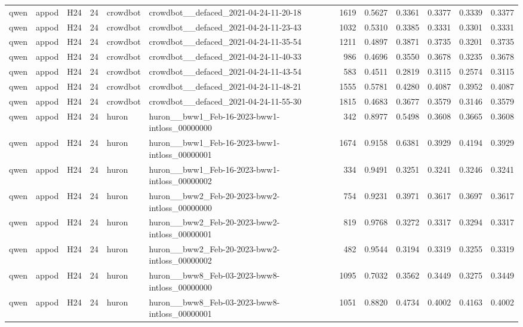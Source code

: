 \begin{table}[tbp]
\begin{tabular}{lllrllrrrrrr}
qwen & appod & H24 & 24 & crowdbot & crowdbot\_\_defaced\_2021-04-24-11-20-18 & 1619 & 0.5627 & 0.3361 & 0.3377 & 0.3339 & 0.3377 \\
qwen & appod & H24 & 24 & crowdbot & crowdbot\_\_defaced\_2021-04-24-11-23-43 & 1032 & 0.5310 & 0.3385 & 0.3331 & 0.3301 & 0.3331 \\
qwen & appod & H24 & 24 & crowdbot & crowdbot\_\_defaced\_2021-04-24-11-35-54 & 1211 & 0.4897 & 0.3871 & 0.3735 & 0.3201 & 0.3735 \\
qwen & appod & H24 & 24 & crowdbot & crowdbot\_\_defaced\_2021-04-24-11-40-33 & 986 & 0.4696 & 0.3550 & 0.3678 & 0.3235 & 0.3678 \\
qwen & appod & H24 & 24 & crowdbot & crowdbot\_\_defaced\_2021-04-24-11-43-54 & 583 & 0.4511 & 0.2819 & 0.3115 & 0.2574 & 0.3115 \\
qwen & appod & H24 & 24 & crowdbot & crowdbot\_\_defaced\_2021-04-24-11-48-21 & 1555 & 0.5781 & 0.4280 & 0.4087 & 0.3952 & 0.4087 \\
qwen & appod & H24 & 24 & crowdbot & crowdbot\_\_defaced\_2021-04-24-11-55-30 & 1815 & 0.4683 & 0.3677 & 0.3579 & 0.3146 & 0.3579 \\
qwen & appod & H24 & 24 & huron & huron\_\_bww1\_Feb-16-2023-bww1-intloss\_00000000 & 342 & 0.8977 & 0.5498 & 0.3608 & 0.3665 & 0.3608 \\
qwen & appod & H24 & 24 & huron & huron\_\_bww1\_Feb-16-2023-bww1-intloss\_00000001 & 1674 & 0.9158 & 0.6381 & 0.3929 & 0.4194 & 0.3929 \\
qwen & appod & H24 & 24 & huron & huron\_\_bww1\_Feb-16-2023-bww1-intloss\_00000002 & 334 & 0.9491 & 0.3251 & 0.3241 & 0.3246 & 0.3241 \\
qwen & appod & H24 & 24 & huron & huron\_\_bww2\_Feb-20-2023-bww2-intloss\_00000000 & 754 & 0.9231 & 0.3971 & 0.3617 & 0.3697 & 0.3617 \\
qwen & appod & H24 & 24 & huron & huron\_\_bww2\_Feb-20-2023-bww2-intloss\_00000001 & 819 & 0.9768 & 0.3272 & 0.3317 & 0.3294 & 0.3317 \\
qwen & appod & H24 & 24 & huron & huron\_\_bww2\_Feb-20-2023-bww2-intloss\_00000002 & 482 & 0.9544 & 0.3194 & 0.3319 & 0.3255 & 0.3319 \\
qwen & appod & H24 & 24 & huron & huron\_\_bww8\_Feb-03-2023-bww8-intloss\_00000000 & 1095 & 0.7032 & 0.3562 & 0.3449 & 0.3275 & 0.3449 \\
qwen & appod & H24 & 24 & huron & huron\_\_bww8\_Feb-03-2023-bww8-intloss\_00000001 & 1051 & 0.8820 & 0.4734 & 0.4002 & 0.4163 & 0.4002 \\

\end{tabular}
\end{table}
